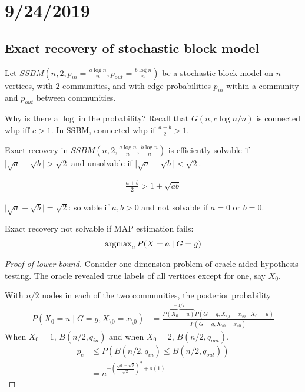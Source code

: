 \section{9/24/2019}

\subsection{Exact recovery of stochastic block model}


\begin{definition}
  Let $SSBM(n, 2, p_{in} = \frac{a \log n}{n}, p_{out} = \frac{b \log n}{n})$
  be a stochastic block model on $n$ vertices,
  with $2$ communities,
  and with edge probabilities $p_{in}$ within a community
  and $p_{out}$ between communities.
\end{definition}

Why is there a $\log$ in the probability?
Recall that $G(n, c \log n / n)$ is connected whp iff $c > 1$.
In SSBM, connected whp if $\frac{a+b}{2} > 1$.

\begin{theorem}
  Exact recovery in $SSBM(n, 2, \frac{a \log n}{n}, \frac{b \log n}{n})$
  is efficiently solvable if $\lvert \sqrt{a} - \sqrt{b} \rvert > \sqrt{2}$
  and unsolvable if $\lvert \sqrt{a} - \sqrt{b} \rvert < \sqrt{2}$.
\end{theorem}

\begin{align}
  \frac{a + b}{2} > 1 + \sqrt{ab}
\end{align}

$\lvert \sqrt{a} - \sqrt{b} \rvert = \sqrt{2}$:
solvable if $a,b > 0$ and not solvable if $a=0$ or $b=0$.

Exact recovery not solvable if MAP estimation fails:
\begin{align}
  \operatorname{argmax}_a P(X=a \mid G=g)
\end{align}

\begin{proof}[Proof of lower bound]
  Consider one dimension problem of oracle-aided hypothesis testing.
  The oracle revealed true labels of all vertices except for one, say $X_0$.

  With $n/2$ nodes in each of the two communities, the posterior
  probability
  \begin{align}
    P(X_0 = u \mid G = g, X_{\setminus 0} = x_{\setminus 0})
    &= \frac{\overbrace{P(X_0 = u)}^{=1/2} P(G = g, X_{\setminus 0} = x_{\setminus 0} \mid X_0 = u )}{
    P(G = g, X_{\setminus 0} = x_{\setminus 0})}
  \end{align}
  When $X_0 = 1$, $B(n/2, q_{in})$ and when $X_0=2$, $B(n/2, q_{out})$.
  \begin{align}
    p_e
    &\leq P(B(n/2, q_{in}) \leq B(n/2, q_{out})) \\
    &= n^{-\left(\frac{\sqrt{a} - \sqrt{b}}{\sqrt{2}}\right)^2 + o(1)}
  \end{align}
\end{proof}


